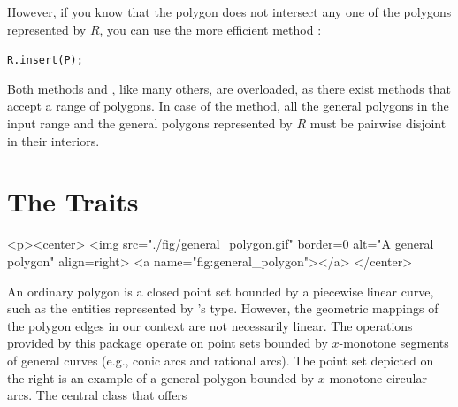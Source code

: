 However, if you know that the polygon does not intersect any one of the
polygons represented by $R$, you can use the more efficient method
:

\begin{alltt}
R.insert(P);
\end{alltt}

Both methods  and , like many others, are 
overloaded, as there exist methods that accept a range of polygons. 
In case of the  method, all the general polygons in the 
input range and the general polygons represented by
$R$ must be pairwise disjoint in their interiors.

\section{The Traits}
\label{bso_sec:traits}
\lcTex{%
  \setlength{\widthRight}{1.4cm}
  \setlength{\widthLeft}{\widthLineReal}
  \addtolength{\widthLeft}{-\widthRight}
  \begin{minipage}{\widthLeft}
}
\label{fig:general_polygon}
\begin{ccHtmlOnly}
  <p><center>
    <img src="./fig/general_polygon.gif" border=0 alt="A general polygon" align=right>
  <a name="fig:general_polygon"></a>
  </center>
\end{ccHtmlOnly}
An ordinary polygon is a closed point set bounded by a piecewise linear 
curve, such as the entities represented by \cgal 's  type. 
However, the geometric mappings of the polygon edges in our context are not
necessarily linear. The operations provided by this package operate on point 
sets bounded by $x$-monotone segments of general curves (e.g., conic arcs and 
rational arcs). The point set depicted on the right is an example of a 
general polygon bounded by $x$-monotone circular arcs. The central class 
 that offers
\\
